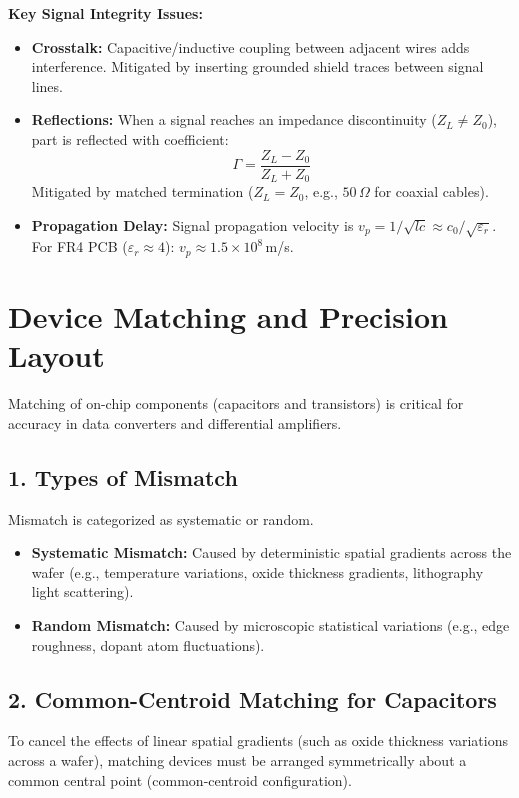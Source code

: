 \documentclass[12pt,a4paper]{article}
\begin{document}
\textbf{Key Signal Integrity Issues:}
\begin{itemize}[leftmargin=*, itemsep=2.5pt]
  \item \textbf{Crosstalk:} Capacitive/inductive coupling between adjacent wires adds interference. Mitigated by inserting grounded shield traces between signal lines.
  \item \textbf{Reflections:} When a signal reaches an impedance discontinuity ($Z_L \neq Z_0$), part is reflected with coefficient:
  \[\Gamma = \frac{Z_L - Z_0}{Z_L + Z_0}\]
  Mitigated by matched termination ($Z_L = Z_0$, e.g., $50\,\Omega$ for coaxial cables).
  \item \textbf{Propagation Delay:} Signal propagation velocity is $v_p = 1/\sqrt{lc} \approx c_0/\sqrt{\varepsilon_r}$. For FR4 PCB ($\varepsilon_r \approx 4$): $v_p \approx 1.5 \times 10^8\,$m/s.
\end{itemize}

\section{Device Matching and Precision Layout}

Matching of on-chip components (capacitors and transistors) is critical for accuracy in data converters and differential amplifiers.

\subsection{1. Types of Mismatch}
Mismatch is categorized as systematic or random.
\begin{itemize}[leftmargin=*, itemsep=2.5pt]
  \item \textbf{Systematic Mismatch:} Caused by deterministic spatial gradients across the wafer (e.g., temperature variations, oxide thickness gradients, lithography light scattering).
  \item \textbf{Random Mismatch:} Caused by microscopic statistical variations (e.g., edge roughness, dopant atom fluctuations).
\end{itemize}

\subsection{2. Common-Centroid Matching for Capacitors}
To cancel the effects of linear spatial gradients (such as oxide thickness variations across a wafer), matching devices must be arranged symmetrically about a common central point (common-centroid configuration).
\end{document}
